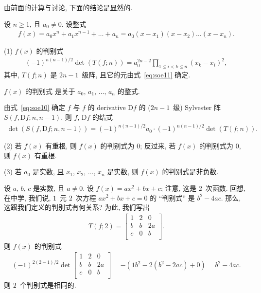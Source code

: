 \documentclass[../libro.tex]{subfiles}
\begin{document}
由前面的计算与讨论, 下面的结论是显然的.

\begin{theorem}
    设 \(n \geq 1\), 且 \(a_0 \neq 0\).
    设整式
    \begin{align*}
        f(x)
        = a_0 x^n + a_1 x^{n-1} + \dots + a_n
        = a_0 (x - x_1) (x - x_2) \dots (x - x_n).
    \end{align*}

    (1)
    \(f(x)\) 的判别式
    \begin{align*}
        (-1)^{n (n-1)/2} \det {(T(f; n))}
        = a_0^{2n-2}
        \prod_{1 \leq i < k \leq n} {(x_k - x_i)^2},
    \end{align*}
    其中, \(T(f; n)\) 是 \(2n-1\)~级阵,
    且它的元由式~\eqref{eq:soe11} 确定.

    \(f(x)\) 的判别式%
    是关于 \(a_0\), \(a_1\), \(\dots\), \(a_n\) 的整式.

    由式~\eqref{eq:soe10} 确定
    \(f\) 与 \(f\) 的 derivative \(\mathrm{D} f\)
    的 (\(2n-1\)~级) Sylvester 阵
    \(S(f, \mathrm{D} f; n, n-1)\).
    则 \(f\), \(\mathrm{D} f\) 的结式
    \begin{align*}
        \det {(S(f, \mathrm{D} f; n, n-1))}
        = (-1)^{n (n-1)/2} a_0
        \cdot (-1)^{n (n-1)/2} \det {(T(f; n))}.
    \end{align*}

    (2)
    若 \(f(x)\) 有重根,
    则 \(f(x)\) 的判别式为 \(0\);
    反过来, 若 \(f(x)\) 的判别式为 \(0\),
    则 \(f(x)\) 有重根.

    (3)
    若 \(a_0\) 是实数,
    且 \(x_1\), \(x_2\), \(\dots\), \(x_n\) 是实数,
    则 \(f(x)\) 的判别式是非负数.
\end{theorem}

\begin{example}
    设 \(a\), \(b\), \(c\) 是实数, 且 \(a \neq 0\).
    设 \(f(x) = a x^2 + b x + c\);
    注意, 这是 \(2\)~次函数.
    回想, 在中学, 我们说,
    \(1\)~元 \(2\)~次方程
    \(a x^2 + b x + c = 0\) 的
    ``判别式'' 是 \(b^2 - 4 a c\).
    那么, 这跟我们定义的判别式有何关系?
    为此, 我们写出
    \begin{align*}
        T(f; 2) =
        \begin{bmatrix}
            1 & 2 & 0   \\
            b & b & 2 a \\
            c & 0 & b   \\
        \end{bmatrix}.
    \end{align*}
    则 \(f(x)\) 的判别式
    \begin{align*}
        (-1)^{2 (2-1)/2} \det {
            \begin{bmatrix}
                1 & 2 & 0   \\
                b & b & 2 a \\
                c & 0 & b   \\
            \end{bmatrix}
        }
        = -(1 b^2 - 2 (b^2 - 2ac) + 0)
        = b^2 - 4ac.
    \end{align*}
    则 \(2\)~个判别式是相同的.
\end{example}
\end{document}
